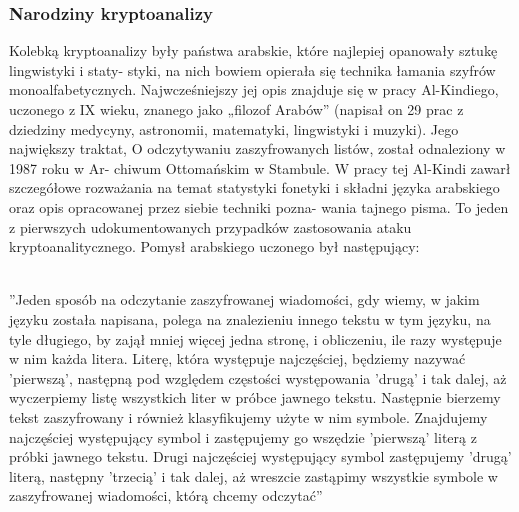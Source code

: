 \documentclass[a4paper]{article}
\begin{document}
\subsubsection{Narodziny kryptoanalizy}
Kolebką kryptoanalizy były państwa arabskie, które najlepiej opanowały sztukę lingwistyki i staty-
styki, na nich bowiem opierała się technika łamania szyfrów monoalfabetycznych. Najwcześniejszy
jej opis znajduje się w pracy Al-Kindiego, uczonego z IX wieku, znanego jako „filozof Arabów”
(napisał on 29 prac z dziedziny medycyny, astronomii, matematyki, lingwistyki i muzyki). Jego
największy traktat, O odczytywaniu zaszyfrowanych listów, został odnaleziony w 1987 roku w Ar-
chiwum Ottomańskim w Stambule. W pracy tej Al-Kindi zawarł szczegółowe rozważania na temat
statystyki fonetyki i składni języka arabskiego oraz opis opracowanej przez siebie techniki pozna-
wania tajnego pisma. To jeden z pierwszych udokumentowanych przypadków zastosowania ataku
kryptoanalitycznego. Pomysł arabskiego uczonego był następujący:\\
\\
\begin{center}
”Jeden sposób na odczytanie zaszyfrowanej wiadomości, gdy wiemy, w jakim języku została
napisana, polega na znalezieniu innego tekstu w tym języku, na tyle długiego, by zajął mniej
więcej jedna stronę, i obliczeniu, ile razy występuje w nim każda litera. Literę, która występuje
najczęściej, będziemy nazywać ’pierwszą’, następną pod względem częstości występowania ’drugą’
i tak dalej, aż wyczerpiemy listę wszystkich liter w próbce jawnego tekstu. Następnie bierzemy
tekst zaszyfrowany i również klasyfikujemy użyte w nim symbole. Znajdujemy najczęściej
występujący symbol i zastępujemy go wszędzie ’pierwszą’ literą z próbki jawnego tekstu. Drugi
najczęściej występujący symbol zastępujemy ’drugą’ literą, następny ’trzecią’ i tak dalej, aż
wreszcie zastąpimy wszystkie symbole w zaszyfrowanej wiadomości, którą chcemy odczytać”\cite{2}
\end{center}
\end{document}
